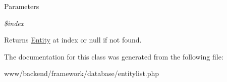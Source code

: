 \begin{DoxyParams}{Parameters}
\item[{\em \$index}]\end{DoxyParams}
\begin{DoxyReturn}{Returns}
\hyperlink{classEntity}{Entity} at index or null if not found. 
\end{DoxyReturn}


The documentation for this class was generated from the following file:\begin{DoxyCompactItemize}
\item 
www/backend/framework/database/entitylist.php\end{DoxyCompactItemize}
